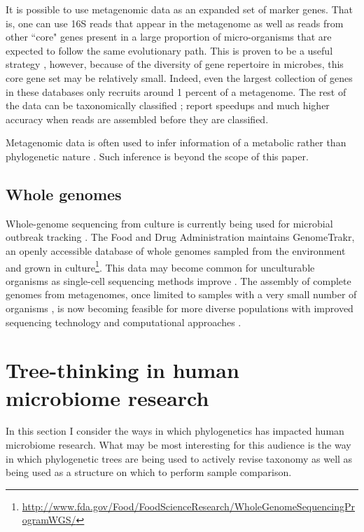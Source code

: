 \documentclass{amsart}
\begin{document}
It is possible to use metagenomic data as an expanded set of marker genes.
That is, one can use 16S reads that appear in the metagenome as well as reads from other ``core" genes present in a large proportion of micro-organisms that are expected to follow the same evolutionary path.
This is proven to be a useful strategy \citep{von2007quantitative,wu2008amphora,stark2010mltreemap,kembel2011phylogenetic}, however, because of the diversity of gene repertoire in microbes, this core gene set may be relatively small.
Indeed, even the largest collection of genes in these databases only recruits around 1 percent of a metagenome.
The rest of the data can be taxonomically classified \citep[methods reviewed by][]{mande2012classification}; \citet{treangen2013metamos} report speedups and much higher accuracy when reads are assembled before they are classified.

Metagenomic data is often used to infer information of a metabolic rather than phylogenetic nature \citep{greenblum2012metagenomic,abubucker2012metabolic}.
Such inference is beyond the scope of this paper.


\subsection{Whole genomes}
Whole-genome sequencing from culture is currently being used for microbial outbreak tracking \citep{koser2012rapid,snitkin2012tracking}.
The Food and Drug Administration maintains GenomeTrakr, an openly accessible database of whole genomes sampled from the environment and grown in culture\footnote{\url{http://www.fda.gov/Food/FoodScienceResearch/WholeGenomeSequencingProgramWGS/}}.
This data may become common for unculturable organisms as single-cell sequencing methods improve \citep[reviewed in][]{kalisky2011single}.
The assembly of complete genomes from metagenomes, once limited to samples with a very small number of organisms \citep{baker2010enigmatic}, is now becoming feasible for more diverse populations with improved sequencing technology and computational approaches \citep{howe2012assembling,pell2012scaling,iverson2012untangling,emerson2012metagenomic,podell2013assembly}.


\section{Tree-thinking in human microbiome research}

In this section I consider the ways in which phylogenetics has impacted human microbiome research.
What may be most interesting for this audience is the way in which phylogenetic trees are being used to actively revise taxonomy as well as being used as a structure on which to perform sample comparison.
\end{document}
